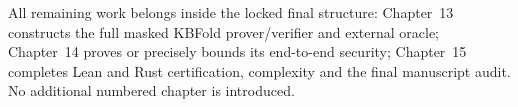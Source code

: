 \begin{remark}
All remaining work belongs inside
the locked final structure:
Chapter~13 constructs the full
masked KBFold prover/verifier
and external oracle; Chapter~14
proves or precisely bounds its
end-to-end security; Chapter~15
completes Lean and Rust
certification, complexity and
the final manuscript audit.
No additional numbered chapter
is introduced.
\end{remark}
